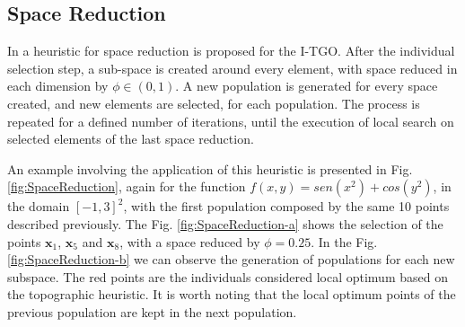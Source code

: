 \subsection{Space Reduction}

In \cite{ITGO4} a heuristic for space reduction is proposed for the I-TGO. After the individual selection step, a sub-space is created around every element, with space reduced in each dimension by $\phi \in (0, 1)$. A new population is generated for every space created, and new elements are selected, for each population. The process is repeated for a defined number of iterations, until the execution of local search on selected elements of the last space reduction.

An example involving the application of this heuristic is presented in Fig. \ref{fig:SpaceReduction}, again for the function $f(x, y) = sen(x^2) + cos(y^2)$, in the domain $[-1, 3]^2$, with the first population composed by the same 10 points described previously. The Fig. \ref{fig:SpaceReduction-a} shows the selection of the points $\bm{x}_1$, $\bm{x}_5$ and $\bm{x}_8$, with a space reduced by $\phi = 0.25$. In the Fig. \ref{fig:SpaceReduction-b} we can observe the generation of populations for each new subspace. The red points are the individuals considered local optimum based on the topographic heuristic. It is worth noting that the local optimum points of the previous population are kept in the next population.


